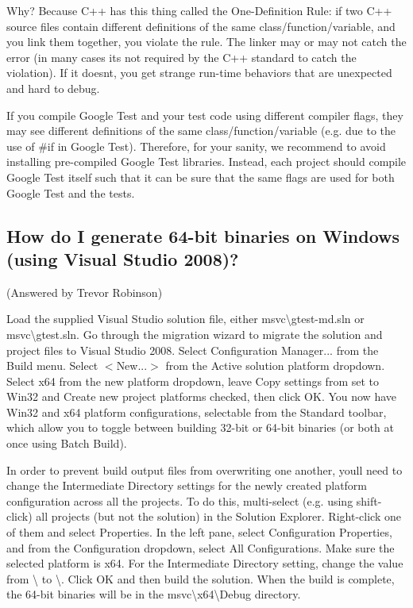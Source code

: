 Why? Because C++ has this thing called the One-\/\+Definition Rule\+: if two C++ source files contain different definitions of the same class/function/variable, and you link them together, you violate the rule. The linker may or may not catch the error (in many cases it\textquotesingle{}s not required by the C++ standard to catch the violation). If it doesn\textquotesingle{}t, you get strange run-\/time behaviors that are unexpected and hard to debug.

If you compile Google Test and your test code using different compiler flags, they may see different definitions of the same class/function/variable (e.\+g. due to the use of {\ttfamily \#if} in Google Test). Therefore, for your sanity, we recommend to avoid installing pre-\/compiled Google Test libraries. Instead, each project should compile Google Test itself such that it can be sure that the same flags are used for both Google Test and the tests.

\subsection*{How do I generate 64-\/bit binaries on Windows (using Visual Studio 2008)?}

(Answered by Trevor Robinson)

Load the supplied Visual Studio solution file, either {\ttfamily msvc\textbackslash{}gtest-\/md.\+sln} or {\ttfamily msvc\textbackslash{}gtest.\+sln}. Go through the migration wizard to migrate the solution and project files to Visual Studio 2008. Select {\ttfamily Configuration Manager...} from the {\ttfamily Build} menu. Select {\ttfamily $<$New...$>$} from the {\ttfamily Active solution platform} dropdown. Select {\ttfamily x64} from the new platform dropdown, leave {\ttfamily Copy settings from} set to {\ttfamily Win32} and {\ttfamily Create new project platforms} checked, then click {\ttfamily OK}. You now have {\ttfamily Win32} and {\ttfamily x64} platform configurations, selectable from the {\ttfamily Standard} toolbar, which allow you to toggle between building 32-\/bit or 64-\/bit binaries (or both at once using Batch Build).

In order to prevent build output files from overwriting one another, you\textquotesingle{}ll need to change the {\ttfamily Intermediate Directory} settings for the newly created platform configuration across all the projects. To do this, multi-\/select (e.\+g. using shift-\/click) all projects (but not the solution) in the {\ttfamily Solution Explorer}. Right-\/click one of them and select {\ttfamily Properties}. In the left pane, select {\ttfamily Configuration Properties}, and from the {\ttfamily Configuration} dropdown, select {\ttfamily All Configurations}. Make sure the selected platform is {\ttfamily x64}. For the {\ttfamily Intermediate Directory} setting, change the value from {\ttfamily \textbackslash{}} to {\ttfamily \textbackslash{}}. Click {\ttfamily OK} and then build the solution. When the build is complete, the 64-\/bit binaries will be in the {\ttfamily msvc\textbackslash{}x64\textbackslash{}Debug} directory.

